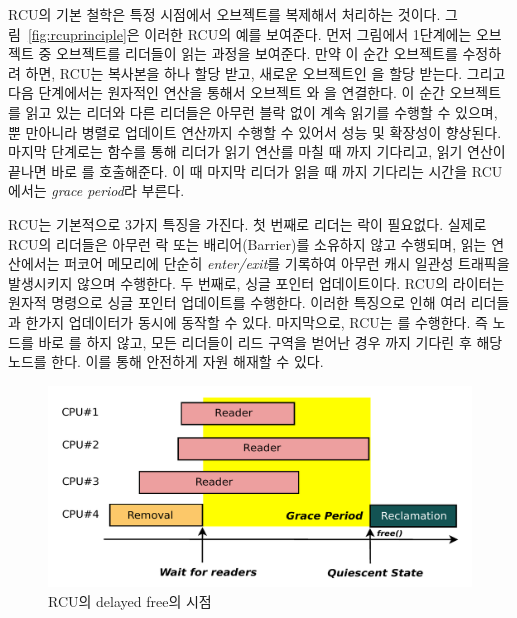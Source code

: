 RCU의 기본 철학은 특정 시점에서 오브젝트를 복제해서 처리하는 것이다. 
그림~\ref{fig:rcuprinciple}은 이러한 RCU의 예를 보여준다.
먼저 그림에서 1단계에는  오브젝트 중  오브젝트를 리더들이 읽는 과정을
보여준다.
만약 이 순간  오브젝트를 수정하려 하면, RCU는 복사본을 하나 할당 받고, 새로운 오브젝트인 을 할당 
받는다.
그리고 다음 단계에서는 원자적인 연산을 통해서 오브젝트 와 을 연결한다. 
이 순간 오브젝트 를 읽고 있는 리더와 다른 리더들은 아무런 블락 없이 계속 읽기를 수행할 수 있으며, 
뿐 만아니라 병렬로 업데이트 연산까지 수행할 수 있어서 성능 및 확장성이 향상된다.
마지막 단계로는  함수를 통해 리더가 읽기 연산를 마칠 때 까지 기다리고, 읽기 연산이
끝나면 바로 를 호출해준다. 
이 때 마지막 리더가 읽을 때 까지 기다리는 시간을 RCU에서는 \textit{grace period}라 부른다.

RCU는 기본적으로 3가지 특징을 가진다. 
첫 번째로 리더는 락이 필요없다.
실제로 RCU의 리더들은 아무런 락 또는 배리어(Barrier)를 소유하지 않고 수행되며, 읽는 연산에서는 
퍼코어 메모리에 단순히 \textit{enter/exit}를 기록하여 아무런 캐시 일관성 트래픽을 발생시키지 않으며 수행한다.
두 번째로, 싱글 포인터 업데이트이다.
RCU의 라이터는 원자적 명령으로 싱글 포인터 업데이트를 수행한다.
이러한 특징으로 인해 여러 리더들과 한가지 업데이터가 동시에 동작할 수 있다.  
마지막으로, RCU는 를 수행한다.
즉 노드를 바로 를 하지 않고, 모든 리더들이 리드 구역을 벋어난 경우 까지 기다린 후 
해당 노드를 한다.
이를 통해 안전하게 자원 해재할 수 있다. 

\begin{figure}[h]
    \centering
    \includegraphics[width=1\textwidth]{fig/rcu/rcu_grace}
    \caption{RCU의 delayed free의 시점}
  \label{fig:rcu_grace}
\end{figure}

